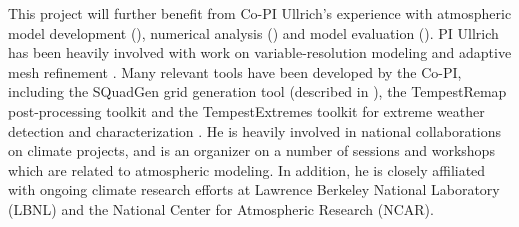 \documentclass[11pt]{article}
\begin{document}
This project will further benefit from Co-PI Ullrich's experience with atmospheric model development  (\cite{ullrich2010high, PHLPAURDN2011SPRINGER, ullrich2012operator, ullrich2012mcore, ullrich2014fluxform, guba2014viscosity, ullrich2014understanding, ullrich2014global}), numerical analysis (\cite{ullrich2011analysis, ullrich2012considerations}) and model evaluation (\cite{DCMIP2012TESTCASES, ullrich2014proposed, kent2013dynamical, ullrich2014baroclinic}).  PI Ullrich has been heavily involved with work on variable-resolution modeling \citep{zarzycki2014aquaplanet} and adaptive mesh refinement  \citep{collins2013nonhydrostatic, mccorquodale2014adaptive}. Many relevant tools have been developed by the Co-PI, including the SQuadGen grid generation tool (described in \cite{guba2014viscosity}), the TempestRemap post-processing toolkit \citep{ullrich2015remapping} and the TempestExtremes toolkit for extreme weather detection and characterization \citep{ullrich2015extremes}. He is heavily involved in national collaborations on climate projects, and is an organizer on a number of sessions and workshops which are related to atmospheric modeling. In addition, he is closely affiliated with ongoing climate research efforts at Lawrence Berkeley National Laboratory (LBNL) and the National Center for Atmospheric Research (NCAR).

{\vbox{}}

\end{document}
